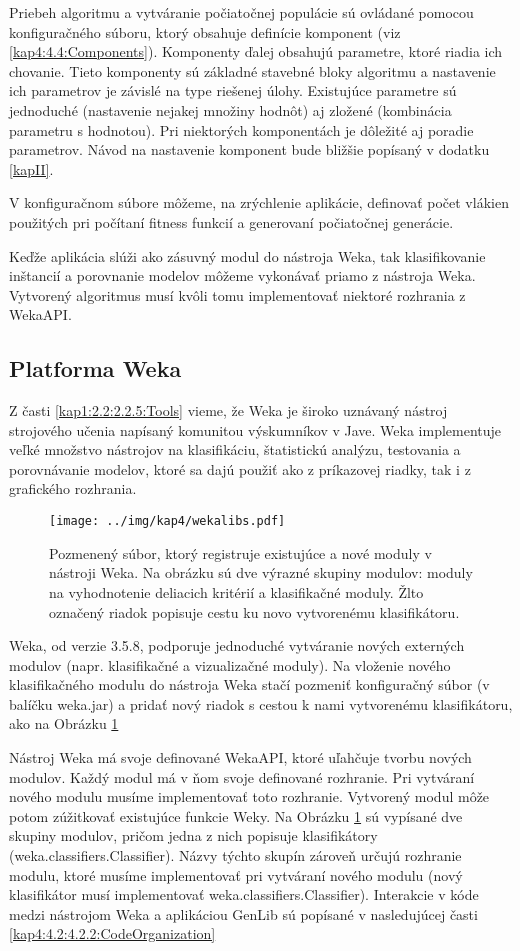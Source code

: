 Priebeh algoritmu a vytváranie počiatočnej populácie sú ovládané pomocou konfiguračného súboru, ktorý obsahuje definície komponent (viz \ref{kap4:4.4:Components}). Komponenty ďalej obsahujú parametre, ktoré riadia ich chovanie. Tieto komponenty sú základné stavebné bloky algoritmu a nastavenie ich parametrov je závislé na type riešenej úlohy. Existujúce parametre sú jednoduché (nastavenie nejakej množiny hodnôt) aj zložené (kombinácia parametru s hodnotou). Pri niektorých komponentách je dôležité aj poradie parametrov. Návod na nastavenie komponent bude bližšie popísaný v dodatku \ref{kapII}.

V konfiguračnom súbore môžeme, na zrýchlenie aplikácie, definovať počet vlákien použitých pri počítaní fitness funkcií a generovaní počiatočnej generácie.

Keďže aplikácia slúži ako zásuvný modul do nástroja Weka, tak klasifikovanie inštancií a porovnanie modelov môžeme vykonávať priamo z nástroja Weka. Vytvorený algoritmus musí kvôli tomu implementovať niektoré rozhrania z WekaAPI.

\subsection{Platforma Weka}\label{kap4:4.2:4.2.1:Weka}
Z časti \ref{kap1:2.2:2.2.5:Tools} vieme, že Weka je široko uznávaný nástroj strojového učenia napísaný komunitou výskumníkov v Jave. Weka implementuje veľké množstvo nástrojov na klasifikáciu, štatistickú analýzu, testovania a porovnávanie modelov, ktoré sa dajú použiť ako z príkazovej riadky, tak i z grafického rozhrania. 

\begin{figure}[h]
\centering
\centerline{\mbox{\texttt{[image: ../img/kap4/wekalibs.pdf]}}}
\caption{Pozmenený súbor, ktorý registruje existujúce a nové moduly v nástroji Weka. Na obrázku sú dve výrazné skupiny modulov: moduly na vyhodnotenie deliacich kritérií a klasifikačné moduly. Žlto označený riadok popisuje cestu ku novo vytvorenému klasifikátoru.}\label{fig:wekalibs}
\end{figure}

Weka, od verzie 3.5.8, podporuje jednoduché vytváranie nových externých modulov (napr. klasifikačné a vizualizačné moduly). Na vloženie nového klasifikačného modulu do nástroja Weka stačí pozmeniť konfiguračný súbor (v balíčku weka.jar) a pridať nový riadok s cestou k nami vytvorenému klasifikátoru, ako na Obrázku \ref{fig:wekalibs}

Nástroj Weka má svoje definované WekaAPI, ktoré uľahčuje tvorbu nových modulov. Každý modul má v ňom svoje definované rozhranie. Pri vytváraní nového modulu musíme implementovať toto rozhranie. Vytvorený modul môže potom zúžitkovať existujúce funkcie Weky. Na Obrázku \ref{fig:wekalibs} sú vypísané dve skupiny modulov, pričom jedna z nich popisuje klasifikátory (weka.classifiers.Classifier). Názvy týchto skupín zároveň určujú rozhranie modulu, ktoré musíme implementovať pri vytváraní nového modulu (nový klasifikátor musí implementovať weka.classifiers.Classifier).
Interakcie v kóde medzi nástrojom Weka a aplikáciou GenLib sú popísané v nasledujúcej časti \ref{kap4:4.2:4.2.2:CodeOrganization}

